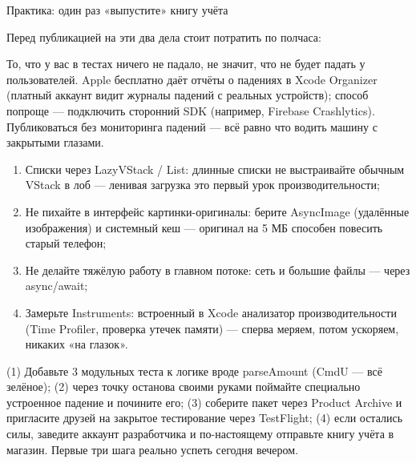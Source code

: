 \begin{tcbpractice}{Практика: один раз «выпустите» книгу учёта}

Перед публикацией на эти два дела стоит потратить по полчаса:


То, что у вас в тестах ничего не падало, не значит, что не будет падать у пользователей. Apple бесплатно даёт отчёты о падениях в Xcode Organizer (платный аккаунт видит журналы падений с реальных устройств); способ попроще — подключить сторонний SDK (например, Firebase Crashlytics). Публиковаться без мониторинга падений — всё равно что водить машину с закрытыми глазами.


\begin{enumerate}
  \item Списки через LazyVStack / List: длинные списки не выстраивайте обычным VStack в лоб — ленивая загрузка это первый урок производительности;
  \item Не пихайте в интерфейс картинки-оригиналы: берите AsyncImage (удалённые изображения) и системный кеш — оригинал на 5 МБ способен повесить старый телефон;
  \item Не делайте тяжёлую работу в главном потоке: сеть и большие файлы — через async/await;
  \item Замерьте Instruments: встроенный в Xcode анализатор производительности (Time Profiler, проверка утечек памяти) — сперва меряем, потом ускоряем, никаких «на глазок».
\end{enumerate}

(1) Добавьте 3 модульных теста к логике вроде parseAmount (CmdU — всё зелёное); (2) через точку останова своими руками поймайте специально устроенное падение и почините его; (3) соберите пакет через Product Archive и пригласите друзей на закрытое тестирование через TestFlight; (4) если остались силы, заведите аккаунт разработчика и по-настоящему отправьте книгу учёта в магазин. Первые три шага реально успеть сегодня вечером.

\end{tcbpractice}

